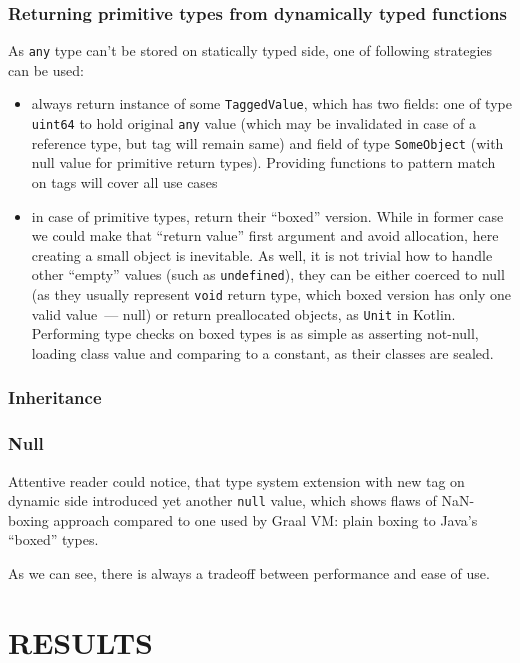 \documentclass[times,specification,annotation]{itmo-student-thesis}
\begin{document}
\subsection{Returning primitive types from dynamically typed functions}
As \texttt{any} type can't be stored on statically typed side, one of following strategies can be used:\\
\begin{itemize}
	\item always return instance of some \texttt{TaggedValue}, which has two fields: one of type \texttt{uint64} to hold original \texttt{any} value (which may be invalidated in case of a reference type, but tag will remain same) and field of type \texttt{SomeObject} (with null value for primitive return types). Providing functions to pattern match on tags will cover all use cases
	\item in case of primitive types, return their ``boxed'' version. While in former case we could make that ``return value'' first argument and avoid allocation, here creating a small object is inevitable. As well, it is not trivial how to handle other ``empty'' values (such as \texttt{undefined}), they can be either coerced to null (as they usually represent \texttt{void} return type, which boxed version has only one valid value~--- null) or return preallocated objects, as \texttt{Unit} in Kotlin. Performing type checks on boxed types is as simple as asserting not-null, loading class value and comparing to a constant, as their classes are sealed.
\end{itemize}
\subsection{Inheritance}
\subsection{Null}
Attentive reader could notice, that type system extension with new tag on dynamic side introduced yet another \texttt{null} value, which shows flaws of NaN-boxing approach compared to one used by Graal VM: plain boxing to Java's ``boxed'' types.

\chapterconclusion
As we can see, there is always a tradeoff between performance and ease of use.

\chapter{RESULTS}
\end{document}
